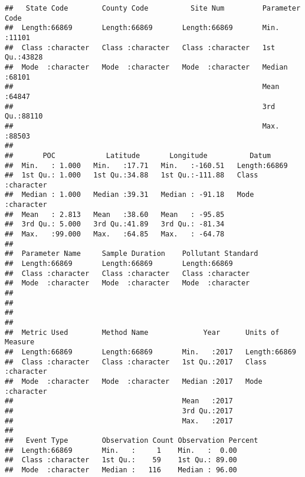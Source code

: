 \documentclass[]{article}
\begin{document}
\begin{verbatim}
##   State Code        County Code          Site Num         Parameter Code 
##  Length:66869       Length:66869       Length:66869       Min.   :11101  
##  Class :character   Class :character   Class :character   1st Qu.:43828  
##  Mode  :character   Mode  :character   Mode  :character   Median :68101  
##                                                           Mean   :64847  
##                                                           3rd Qu.:88110  
##                                                           Max.   :88503  
##                                                                          
##       POC            Latitude       Longitude          Datum          
##  Min.   : 1.000   Min.   :17.71   Min.   :-160.51   Length:66869      
##  1st Qu.: 1.000   1st Qu.:34.88   1st Qu.:-111.88   Class :character  
##  Median : 1.000   Median :39.31   Median : -91.18   Mode  :character  
##  Mean   : 2.813   Mean   :38.60   Mean   : -95.85                     
##  3rd Qu.: 5.000   3rd Qu.:41.89   3rd Qu.: -81.34                     
##  Max.   :99.000   Max.   :64.85   Max.   : -64.78                     
##                                                                       
##  Parameter Name     Sample Duration    Pollutant Standard
##  Length:66869       Length:66869       Length:66869      
##  Class :character   Class :character   Class :character  
##  Mode  :character   Mode  :character   Mode  :character  
##                                                          
##                                                          
##                                                          
##                                                          
##  Metric Used        Method Name             Year      Units of Measure  
##  Length:66869       Length:66869       Min.   :2017   Length:66869      
##  Class :character   Class :character   1st Qu.:2017   Class :character  
##  Mode  :character   Mode  :character   Median :2017   Mode  :character  
##                                        Mean   :2017                     
##                                        3rd Qu.:2017                     
##                                        Max.   :2017                     
##                                                                         
##   Event Type        Observation Count Observation Percent
##  Length:66869       Min.   :     1    Min.   :  0.00     
##  Class :character   1st Qu.:    59    1st Qu.: 89.00     
##  Mode  :character   Median :   116    Median : 96.00     

\end{verbatim}
\end{document}
